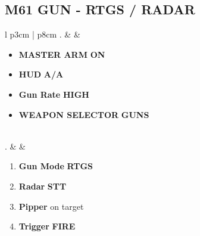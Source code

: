 \documentclass[8pt,usenames,dvipsnames,twoside]{article}
\begin{document}
		\subsection{M61 GUN - RTGS / RADAR}
		\begin{center}
			\begin{tabular}{l p{3cm} | p{8cm}}
				. &  & 
				\begin{minipage}[t]{\linewidth}
					\vspace{-7pt}
					\begin{itemize}
						\item \textbf{MASTER ARM} \dotfill \textbf{ON}
						\item \textbf{HUD} \dotfill \textbf{A/A}
						\item \textbf{Gun Rate} \dotfill \textbf{HIGH}
						\item \textbf{WEAPON SELECTOR} \dotfill \textbf{GUNS}
					\end{itemize} 
				\end{minipage} \\
				. &  & 
				\begin{minipage}[t]{\linewidth}
					\vspace{-7pt}
					\begin{enumerate}[label=(\alph*)]
						\item \textbf{Gun Mode} \dotfill \textbf{RTGS}
						\item \textbf{Radar} \dotfill \textbf{STT}
						\item \textbf{Pipper} \dotfill on target
						\item \textbf{Trigger} \dotfill \textbf{FIRE}
					\end{enumerate}
				\end{minipage} \\
				\bottomrule
			\end{tabular}
		\end{center}
	
		\clearpage
		
\end{document}
